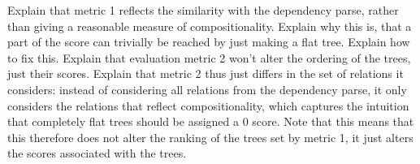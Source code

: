 \documentclass[a4paper, 11pt]{report}
\theoremstyle{definition}
\theoremstyle{plain}
\begin{document}
Explain that metric 1 reflects the similarity with the dependency parse, rather than giving a reasonable measure of compositionality. Explain why this is, that a part of the score can trivially be reached by just making a flat tree. Explain how to fix this. Explain that evaluation metric 2 won't alter the ordering of the trees, just their scores.
Explain that metric 2 thus just differs in the set of relations it considers: instead of considering all relations from the dependency parse, it only considers the relations that reflect compositionality, which captures the intuition that completely flat trees should be assigned a 0 score. Note that this means that this therefore does not alter the ranking of the trees set by metric 1, it just alters the scores associated with the trees.



















\end{document}
